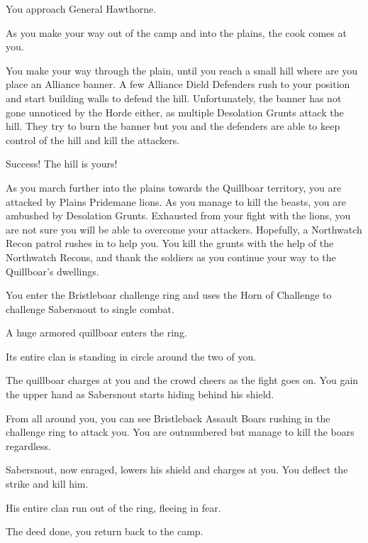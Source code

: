 You approach General Hawthorne.




As you make your way out of the camp and into the plains, the cook comes at you.


You make your way through the plain, until you reach a small hill where are you place an Alliance banner. A few Alliance Dield Defenders rush to your position and start building walls to defend the hill.  Unfortunately, the banner has not gone unnoticed by the Horde either, as multiple Desolation Grunts attack the hill. They try to burn the banner but you and the defenders are able to keep control of the hill and kill the attackers.

Success! The hill is yours!

As you march further into the plains towards the Quillboar territory,  you are attacked by Plains Pridemane lions. As you manage to kill the beasts, you are ambushed by Desolation Grunts. Exhausted from your fight with the lions,  you are not sure you will be able to overcome your attackers. Hopefully, a Northwatch Recon patrol rushes in to help you. You kill the grunts with the help of the Northwatch Recons, and thank the soldiers as you continue your way to the Quillboar's dwellings.

You enter the Bristleboar challenge ring and uses the Horn of Challenge to challenge Sabersnout to single combat.

A huge armored quillboar enters the ring.


Its entire clan is standing in circle around the two of you.


The quillboar charges at you and the crowd cheers as the fight goes on. You gain the upper hand as Sabersnout starts hiding behind his shield.



From all around you, you can see Bristleback Assault Boars rushing in the challenge ring to attack you.  You are outnumbered but manage to kill the boars regardless.


Sabersnout, now enraged, lowers his shield and charges at you. You deflect the strike and kill him.


His entire clan run out of the ring, fleeing in fear.

The deed done, you return back to the camp.
